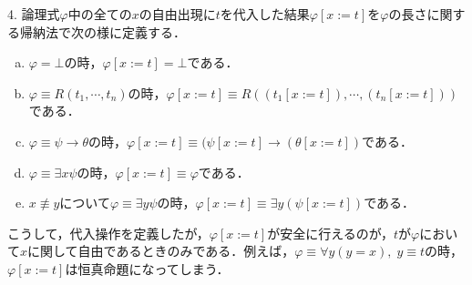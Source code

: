 \documentclass[uplatex, 12pt, dvipdfmx]{jsreport}
\begin{document}
\begin{definition}
    4. 論理式$\varphi$中の全ての$x$の自由出現に$t$を代入した結果$\varphi[x:=t]$を$\varphi$の長さに関する帰納法で次の様に定義する．
    \begin{enumerate}[(a)]
        \item $\varphi=\bot$の時，$\varphi[x:=t]=\bot$である．
        \item $\varphi\equiv R(t_1,\cdots,t_n)$の時，$\varphi[x:=t]\equiv R((t_1[x:=t]),\cdots,(t_n[x:=t]))$である．
        \item $\varphi\equiv\psi\to\theta$の時，$\varphi[x:=t]\equiv (\psi[x:=t]\to(\theta[x:=t])$である．
        \item $\varphi\equiv\exists x\psi$の時，$\varphi[x:=t]\equiv\varphi$である．
        \item $x\not\equiv y$について$\varphi\equiv\exists y\psi$の時，$\varphi[x:=t]\equiv\exists y(\psi[x:=t])$である．
    \end{enumerate}
\end{definition}
\begin{remark}
    こうして，代入操作を定義したが，$\varphi[x:=t]$が安全に行えるのが，$t$が$\varphi$において$x$に関して自由であるときのみである．例えば，$\varphi\equiv\forall y(y=x),\;y\equiv t$の時，$\varphi[x:=t]$は恒真命題になってしまう．
\end{remark}
\end{document}
